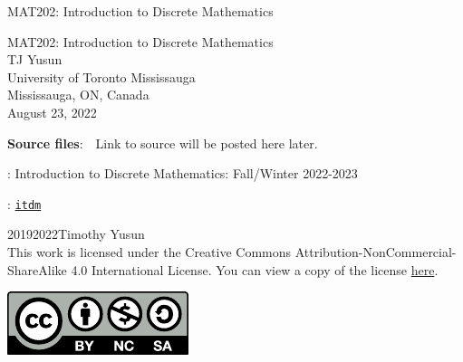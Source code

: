 \documentclass[oneside,10pt,]{book}
\newcommand{\titlepagefont}{\relax}
\newcommand{\mono}[1]{\texttt{#1}}
\numberwithin{equation}{section}
\begin{document}
\frontmatter
\thispagestyle{empty}
{\titlepagefont\centering
\vspace*{0.28\textheight}
{\Huge MAT202: Introduction to Discrete Mathematics}\\}
\clearpage
\thispagestyle{empty}
{\titlepagefont\centering
\vspace*{0.14\textheight}
{\Huge MAT202: Introduction to Discrete Mathematics}\\[3\baselineskip]
{\Large TJ Yusun}\\[0.5\baselineskip]
{\Large University of Toronto Mississauga\\
Mississauga, ON, Canada}\\[3\baselineskip]
{\Large August 23, 2022}\\}
\clearpage
\thispagestyle{empty}
\hypertarget{x:colophon:colophon}{}
\par\noindent
\textbf{Source files}:\ \ Link to source will be posted here later. 
\par{}
: Introduction to Discrete Mathematics: Fall\slash{}Winter 2022-2023\par\medskip
{}: \href{https:\slash{}\slash{}tjyusun.com\slash{}MAT202\slash{}}{\mono{itdm}}\par\medskip
\noindent\textcopyright{}2019\textendash{}2022\quad{}Timothy Yusun\\[0.5\baselineskip]
This work is licensed under the Creative Commons Attribution-NonCommercial-ShareAlike 4.0 International License. You can view a copy of the license \href{http://creativecommons.org/licenses/by-nc-sa/4.0/}{here}. \begin{image}{0.375}{0.25}{0.375}%
\includegraphics[width=\linewidth]{figs/by-nc-sa}
\end{image}%
\end{document}
